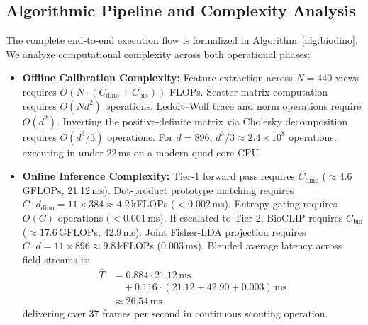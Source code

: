 \documentclass[a4paper,fleqn,nologo]{cas-dc}
\begin{document}
\subsection{Algorithmic Pipeline and Complexity Analysis}
\label{sec:complexity}
The complete end-to-end execution flow is formalized in Algorithm~\ref{alg:biodino}. We analyze computational complexity across both operational phases:
\begin{itemize}
    \item \textbf{Offline Calibration Complexity:} Feature extraction across $N=440$ views requires $O(N \cdot (C_{\text{dino}} + C_{\text{bio}}))$ FLOPs. Scatter matrix computation requires $O(N d^2)$ operations. Ledoit--Wolf trace and norm operations require $O(d^2)$. Inverting the positive-definite matrix via Cholesky decomposition requires $O(d^3 / 3)$ operations. For $d=896$, $d^3 / 3 \approx 2.4 \times 10^8$ operations, executing in under 22\,ms on a modern quad-core CPU.
    \item \textbf{Online Inference Complexity:} Tier-1 forward pass requires $C_{\text{dino}}$ ($\approx 4.6$\,GFLOPs, 21.12\,ms). Dot-product prototype matching requires $C \cdot d_{\text{dino}} = 11 \times 384 \approx 4.2$\,kFLOPs ($<$0.002\,ms). Entropy gating requires $O(C)$ operations ($<$0.001\,ms). If escalated to Tier-2, BioCLIP requires $C_{\text{bio}}$ ($\approx 17.6$\,GFLOPs, 42.9\,ms). Joint Fisher-LDA projection requires $C \cdot d = 11 \times 896 \approx 9.8$\,kFLOPs (0.003\,ms). Blended average latency across field streams is:
    \begin{align}
        \bar{T} &= 0.884 \cdot 21.12\,\text{ms} \nonumber \\
        &\quad + 0.116 \cdot (21.12 + 42.90 + 0.003)\,\text{ms} \nonumber \\
        &\approx 26.54\,\text{ms}
    \end{align}
    delivering over 37 frames per second in continuous scouting operation.
\end{itemize}
\end{document}
